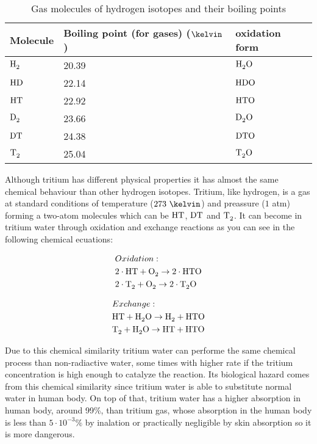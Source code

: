 \begin{table}[htbp]
\begin{center}
\begin{tabular}{|l|l|l|}
\hline
Molecule & Boiling point (for gases) ($\kelvin$) & oxidation form\\
\hline \hline \hline
$\ce{H_2}$ & 20.39 & $\ce{H_2 O}$ \\ \hline
$\ce{HD}$ & 22.14 & $\ce{HDO}$ \\ \hline
$\ce{HT}$ & 22.92 & $\ce{HTO}$ \\ \hline
$\ce{D_2}$ & 23.66 & $\ce{D_2 O}$ \\ \hline
$\ce{DT}$ & 24.38 & $\ce{DTO}$ \\ \hline
$\ce{T_2}$ & 25.04 & $\ce{T_2 O}$ \\ \hline
\end{tabular}
\caption{Gas molecules of hydrogen isotopes and their boiling points}
\label{BoillingPoints}
\end{center}
\end{table}

Although tritium has different physical properties it has almost the same chemical behaviour than other hydrogen isotopes. Tritium, like hydrogen, is a gas at standard conditions of temperature ($273~\kelvin$) and preassure ($1$ atm) forming a two-atom molecules which can be $\ce{HT}$, $\ce{DT}$ and $\ce{T_2}$. It can become in tritium water through oxidation and exchange reactions as you can see in the following chemical ecuations\cite{TritiumHandling}:

\begin{equation}
\begin{split}
& Oxidation: \\
& 2\cdot{}\ce{HT} + \ce{O_2} \rightarrow 2 \cdot{} \ce{HTO}\\
& 2\cdot{}\ce{T_2} + \ce{O_2} \rightarrow 2 \cdot{} \ce{T_2 O}
\label{oxidation}
\end{split}
\end{equation}

\begin{equation}
\begin{split}
& Exchange: \\
& \ce{HT} + \ce{H_2 O} \rightarrow \ce{H_2} + \ce{HTO}\\
& \ce{T_2} + \ce{H_2 O} \rightarrow \ce{HT} + \ce{HTO}\\
\label{exchange}
\end{split}
\end{equation}

Due to this chemical similarity tritium water can performe the same chemical process than non-radiactive water, some times with higher rate if the tritium concentration is high enough to catalyze the reaction. Its biological hazard comes from this chemical similarity since tritium water is able to substitute normal water in human body. On top of that, tritium water has a higher absorption in human body, around 99\%, than tritium gas, whose absorption in the human body is less than $5 \cdot 10^{-3}\%$  by inalation or practically negligible by skin absorption \cite{TritiumHandling} so it is more dangerous.